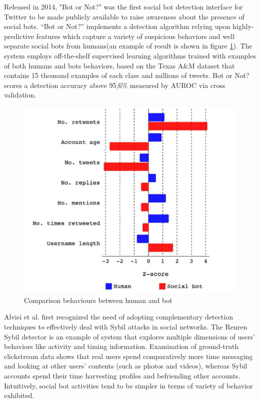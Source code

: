 \documentclass[conference, onecolumn]{IEEEtran}
\begin{document}
Released in 2014, "Bot or Not?" was the first social bot detection interface for Twitter to be made publicly available to raise awareness about the presence of social bots. “Bot or Not?” implements a detection algorithm relying upon highly-predictive features which capture a variety of suspicious behaviors and well separate social bots from humans(an example of result is shown in figure \ref{fig:tweetbot}). The system employs off-the-shelf supervised learning algorithms trained with examples of both humans and bots behaviors, based on the Texas A\&M dataset that contains 15 thousand examples of each class and millions of tweets. Bot or Not? scores a detection accuracy above 95,6\% measured by AUROC via cross validation.
\begin{figure} [!htbp]
	\centering
	\vspace{0.3cm}
	\includegraphics[scale=0.6]{images/tweetbot}
	\caption{Comparison behaviours between human and bot}
	\vspace{0.3cm}
	\label{fig:tweetbot}
\end{figure}
\medskip

Alvisi et al. first recognized the need of adopting complementary detection techniques to effectively deal with Sybil attacks in social networks. The Renren Sybil detector is an example of system that explores multiple dimensions of users' behaviors like activity and timing information. Examination of ground-truth clickstream data shows that real users spend comparatively more time messaging and looking at other users' contents (such as photos and videos), whereas Sybil accounts spend their time harvesting profiles and befriending other accounts. Intuitively, social bot activities tend to be simpler in terms of variety of behavior exhibited.
\medskip
\end{document}
